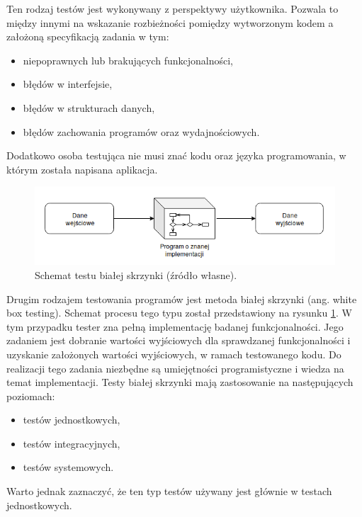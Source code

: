 Ten rodzaj testów jest wykonywany z perspektywy użytkownika.
Pozwala to między innymi na wskazanie rozbieżności pomiędzy wytworzonym kodem a założoną specyfikacją zadania w tym:
\begin {itemize}
\item niepoprawnych lub brakujących funkcjonalności,
\item błędów w interfejsie,
\item błędów w strukturach danych,
\item błędów zachowania programów oraz wydajnościowych.
\end{itemize}
Dodatkowo osoba testująca nie musi znać kodu oraz języka programowania, w którym została napisana aplikacja.

\begin{figure}[h]
    \centering
    \includegraphics[width = 13cm]{chapter01/white-box.png}
    \caption{Schemat testu białej skrzynki (źródło własne).}
    \label{fig:white-box}
\end{figure}

Drugim rodzajem testowania programów jest metoda białej skrzynki (ang. white box testing).
Schemat procesu tego typu został przedstawiony na rysunku \ref{fig:white-box}.
W tym przypadku tester zna pełną implementację badanej funkcjonalności.
Jego zadaniem jest dobranie wartości wyjściowych dla sprawdzanej funkcjonalności i uzyskanie założonych wartości wyjściowych, w ramach testowanego kodu.
Do realizacji tego zadania niezbędne są umiejętności programistyczne i wiedza na temat implementacji.
Testy białej skrzynki mają zastosowanie na następujących poziomach:
\begin{itemize}
\item testów jednostkowych,
\item testów integracyjnych,
\item testów systemowych.
\end{itemize}
Warto jednak zaznaczyć, że ten typ testów używany jest głównie w testach jednostkowych.

